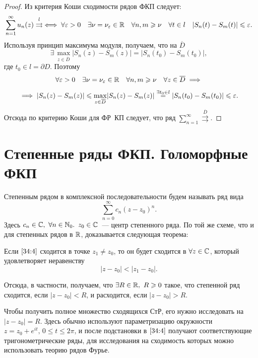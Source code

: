 \documentclass[../../main.tex]{subfiles}
\begin{document}
\begin{proof}
	Из критерия Коши сходимости рядов ФКП следует:
	\[ \sum\limits_{n = 1}^{\infty} u_n(z) \overset{l}\rightrightarrows \iff 
	\forall \varepsilon > 0\quad \exists \nu = \nu_\varepsilon \in \mathbb{R} \quad \forall n, m 
	\geqslant \nu \quad \forall t \in l \quad |S_n(t) - S_m(t)| \leqslant \varepsilon. \]
	Используя принцип максимума модуля, получаем, что на $ \overline{D} $ 
	\[\exists\, \underset{z \in \overline{D}}{\max}|S_n(z) - S_m(z)| = |S_n(t_0) 
	- S_m(t_0)| ,\] 
	где $ t_0 \in l = \partial D $.
	Поэтому \[ \forall \varepsilon > 0\quad \exists \nu = \nu_\varepsilon \in \mathbb{R} \quad \forall 
	n, m \geqslant \nu \quad \forall z \in \overline{D} \implies\]
	\[\implies |S_n(z) - S_m(z)| 
	\leqslant \underset{z \in \overline{D}}{\max}|S_n(z) - S_m(z)| \overset{\exists 
	t_0 \in l}= 
	|S_n(t_0) - S_m(t_0)| \leqslant \varepsilon.\]
	Отсюда по критерию Коши для ФР~КП следует, что ряд $ \sum\limits_{n = 
	1}^{\infty} \overset{\overline{D}}\rightrightarrows $.
\end{proof}

\section{Степенные ряды ФКП. Голоморфные ФКП}

Степенным рядом в комплексной последовательности будем называть ряд вида
\begin{equation}\label{34:4}
	\sum\limits_{n = 0}^{\infty} c_n (z - z_0)^n.
\end{equation}
Здесь $ c_n \in \mathbb{C},\ \forall n \in \mathbb{N}_0.$ $z_0 \in \mathbb{C} $~--- центр 
степенного ряда. По той же схеме, что и для степенных рядов в $ \mathbb{R} $, 
доказывается следующая теорема:
\begin{thm}
	Если $ \eqref{34:4} $ сходится в точке $ z_1 \neq z_0 $, то он будет сходится 
	в
	$ \forall z \in \mathbb{C} $, который удовлетворяет неравенству
	\[ |z - z_0| < |z_1 - z_0|. \]
\end{thm}

Отсюда, в частности, получаем, что $ \exists R \in \mathbb{R},\ R \geqslant 0$ такое, 
что степенной ряд сходится, если $ |z - z_0| < R $, и расходится, если
$ |z - z_0| > R $.

Чтобы получить полное множество сходящихся СтР, его нужно исследовать на
${|z - z_0| = R}$. Здесь обычно используют параметризацию окружности
$ z = z_0 + e^{it},\, 0 \leq t \leq 2\pi $, и после подстановки в $ 
\eqref{34:4} $ получают 
соответствующие тригонометрические ряды, для исследования на сходимость 
которых можно использовать теорию рядов Фурье.
\end{document}
